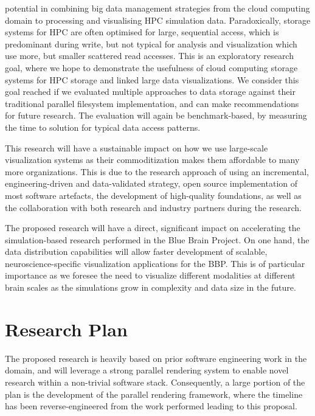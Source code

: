 \begin{compactdesc}
potential in combining big data management strategies from the cloud computing
domain to processing and visualising HPC simulation data. Paradoxically, storage
systems for HPC are often optimised for large, sequential access, which is
predominant during write, but not typical for analysis and visualization which
use more, but smaller scattered read accesses. This is an exploratory research
goal, where we hope to demonstrate the usefulness of cloud computing storage
systems for HPC storage and linked large data visualizations. We consider this
goal reached if we evaluated multiple approaches to data storage against their
traditional parallel filesystem implementation, and can make recommendations for
future research. The evaluation will again be benchmark-based, by measuring the
time to solution for typical data access patterns.
\end{compactdesc}

This research will have a sustainable impact on how we use large-scale
visualization systems as their commoditization makes them affordable to many
more organizations. This is due to the research approach of using an
incremental, engineering-driven and data-validated strategy, open source
implementation of most software artefacts, the development of high-quality
foundations, as well as the collaboration with both research and industry
partners during the research.

The proposed research will have a direct, significant impact on accelerating the
simulation-based research performed in the Blue Brain Project. On one hand, the
data distribution capabilities will allow faster development of scalable,
neuroscience-specific visualization applications for the BBP. This is of
particular importance as we foresee the need to visualize different modalities
at different brain scales as the simulations grow in complexity and data size in
the future.

\section{Research Plan\label{sPlan}}

The proposed research is heavily based on prior software engineering work in the
domain, and will leverage a strong parallel rendering system to enable novel
research within a non-trivial software stack. Consequently, a large portion of
the plan is the development of the parallel rendering framework, where the
timeline has been reverse-engineered from the work performed leading to this
proposal.

